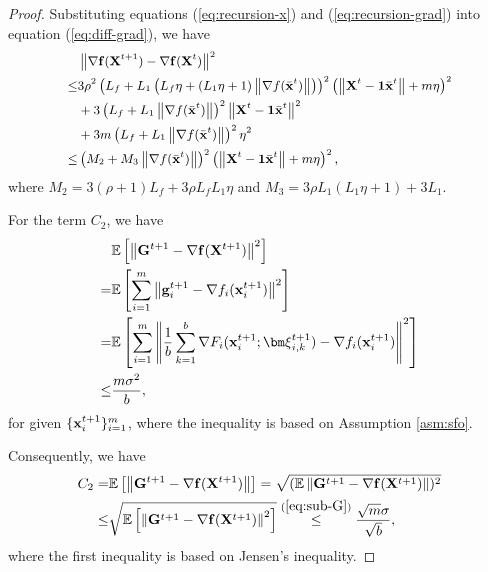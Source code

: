 \documentclass[sigconf]{acmart}
\newcommand{\Norm}[1]{\left\| #1 \right\|}
\def\vone{{\bf{1}}}
\def\vf{{\bf{f}}}
\def\vg{{\bf{g}}}
\def\vx{{\bf{x}}}
\def\BE{{\mathbb{E}}}
\def\mG {{\bf G}}
\def\mX {{\bf X}}
\theoremstyle{plain}
\def\bx{{\bar\vx}}
\def\vxi{{\bm\xi}}
\begin{document}
\begin{proof}
Substituting equations (\ref{eq:recursion-x}) and (\ref{eq:recursion-grad}) into equation (\ref{eq:diff-grad}), we have
\begin{align}\label{eq:diff-grad-2}\small
\begin{split}    
& \Norm{\nabla \vf(\mX^{t+1}) - \nabla \vf(\mX^t)}^2 \\
\leq & 3 \rho^2 \left(L_f+L_1\left(L_f\eta + (L_1\eta+1)\Norm{\nabla f(\bx^{t})}\right)\right)^2\left(\Norm{\mX^t - \vone\bx^t} + m\eta\right)^2 \\
 &  + 3\left(L_f+L_1\Norm{\nabla f(\bx^t)}\right)^2\Norm{\mX^{t} - \vone\bx^{t}}^2 \\
 & + 3m\left(L_f+L_1\Norm{\nabla f(\bx^t)}\right)^2\eta^2 \\
\leq & \left(M_2 + M_3\Norm{\nabla f(\bx^{t})}\right)^2 \left(\Norm{\mX^t - \vone\bx^t} + m\eta\right)^2,
\end{split}
\end{align}
where $M_2 = {3}(\rho+1)L_f+{3}\rho L_fL_1\eta$ and 
$M_3 = {3}\rho L_1(L_1\eta+1)+{3}L_1$.

For the term $C_2$, we have
\begin{align}\label{eq:sub-G}
\begin{split}    
  & \BE\left[\Norm{\mG^{t+1} - \nabla \vf(\mX^{t+1})}^2\right]  \\
= & \BE\left[\sum_{i=1}^m \Norm{\vg_i^{t+1} - \nabla f_i(\vx_i^{t+1})}^2\right] \\
= & \BE\left[\sum_{i=1}^m \Norm{
 \frac{1}{b}\sum_{k=1}^b \nabla F_i(\vx_i^{t+1};\vxi_{i,k}^{t+1}) - \nabla f_i(\vx_i^{t+1})}^2\right]    \\
\leq & \frac{m\sigma^2}{b},
\end{split}
\end{align}
for given $\{\vx_i^{t+1}\}_{i=1}^m$, 
where the inequality is based on Assumption \ref{asm:sfo}.

Consequently, we have
\begin{align}\label{eq:gtp1}
\begin{split}    
 C_2 = & \BE\left[\Norm{\mG^{t+1} - \nabla \vf(\mX^{t+1})}\right]  
=  \sqrt{(\BE\Norm{\mG^{t+1} - \nabla \vf(\mX^{t+1})})^2} \\
\leq & \sqrt{\BE\left[\Norm{\mG^{t+1} - \nabla \vf(\mX^{t+1})}^2\right]}
\overset{(\ref{eq:sub-G})}{\leq}  \frac{\sqrt{m}\sigma}{\sqrt{b}},
\end{split}
\end{align}
where the first inequality is based on Jensen's inequality.


\end{proof}
\end{document}
